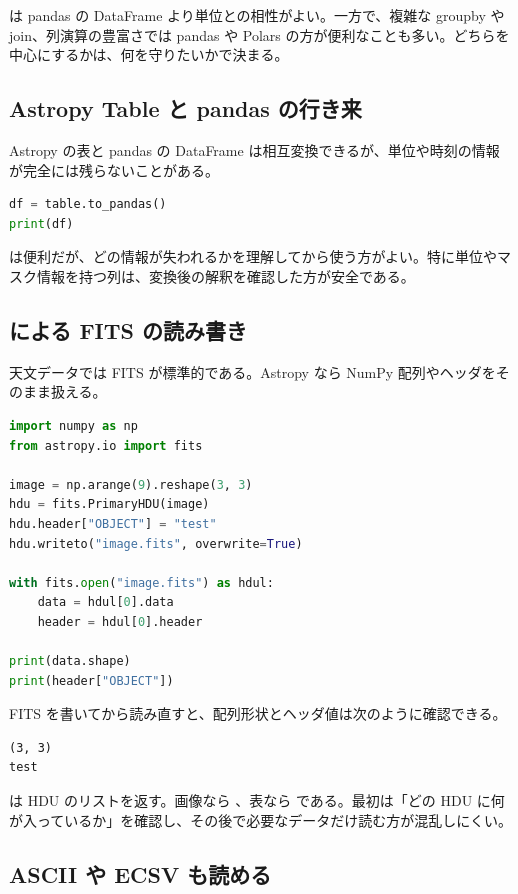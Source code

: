  は pandas の DataFrame より単位との相性がよい。一方で、複雑な groupby や join、列演算の豊富さでは pandas や Polars の方が便利なことも多い。どちらを中心にするかは、何を守りたいかで決まる。

\subsection{Astropy Table と pandas の行き来}

Astropy の表と pandas の DataFrame は相互変換できるが、単位や時刻の情報が完全には残らないことがある。

\begin{lstlisting}[language=Python]
df = table.to_pandas()
print(df)
\end{lstlisting}

 は便利だが、どの情報が失われるかを理解してから使う方がよい。特に単位やマスク情報を持つ列は、変換後の解釈を確認した方が安全である。

\subsection{ による FITS の読み書き}

天文データでは FITS が標準的である。Astropy なら NumPy 配列やヘッダをそのまま扱える。

\begin{lstlisting}[language=Python]
import numpy as np
from astropy.io import fits

image = np.arange(9).reshape(3, 3)
hdu = fits.PrimaryHDU(image)
hdu.header["OBJECT"] = "test"
hdu.writeto("image.fits", overwrite=True)

with fits.open("image.fits") as hdul:
    data = hdul[0].data
    header = hdul[0].header

print(data.shape)
print(header["OBJECT"])
\end{lstlisting}

FITS を書いてから読み直すと、配列形状とヘッダ値は次のように確認できる。

\begin{lstlisting}[numbers=none, xleftmargin=2\zw]
(3, 3)
test
\end{lstlisting}

 は HDU のリストを返す。画像なら 、表なら  である。最初は「どの HDU に何が入っているか」を確認し、その後で必要なデータだけ読む方が混乱しにくい。

\subsection{ASCII や ECSV も読める}

